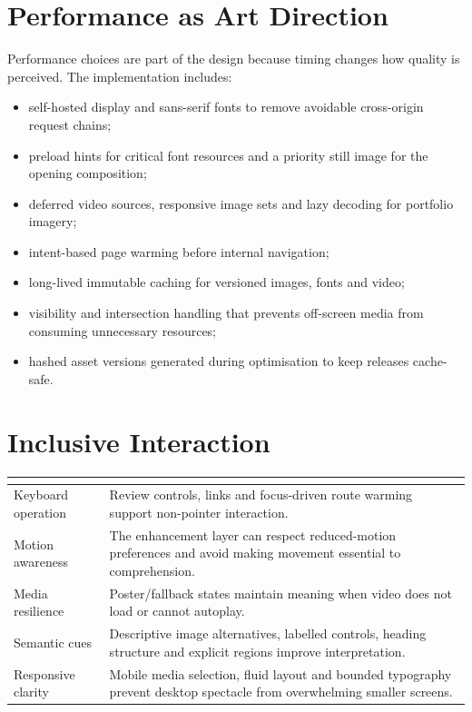 \documentclass[10.5pt,a4paper]{article}
\newcommand{\eyebrow}[1]{%
  {\fontsize{7.8}{10}\selectfont\bfseries\color{MarkouStone}\textls[180]{\MakeUppercase{#1}}}%
}
\begin{document}
\section{Performance as Art Direction}
Performance choices are part of the design because timing changes how quality
is perceived. The implementation includes:

\begin{itemize}
  \item self-hosted display and sans-serif fonts to remove avoidable
  cross-origin request chains;
  \item preload hints for critical font resources and a priority still image
  for the opening composition;
  \item deferred video sources, responsive image sets and lazy decoding for
  portfolio imagery;
  \item intent-based page warming before internal navigation;
  \item long-lived immutable caching for versioned images, fonts and video;
  \item visibility and intersection handling that prevents off-screen media
  from consuming unnecessary resources;
  \item hashed asset versions generated during optimisation to keep releases
  cache-safe.
\end{itemize}

\section{Inclusive Interaction}
\begin{tabularx}{\textwidth}{p{40mm} X}
\toprule
\eyebrow{Principle} & \eyebrow{Delivered consideration}\\
\midrule
Keyboard operation & Review controls, links and focus-driven route warming
support non-pointer interaction.\\
Motion awareness & The enhancement layer can respect reduced-motion
preferences and avoid making movement essential to comprehension.\\
Media resilience & Poster/fallback states maintain meaning when video does not
load or cannot autoplay.\\
Semantic cues & Descriptive image alternatives, labelled controls, heading
structure and explicit regions improve interpretation.\\
Responsive clarity & Mobile media selection, fluid layout and bounded
typography prevent desktop spectacle from overwhelming smaller screens.\\
\bottomrule
\end{tabularx}
\end{document}
